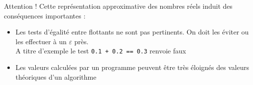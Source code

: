 \documentclass[10pt]{beamer}
\begin{document}
\begin{frame}{\Ctitle}{\stitle}
    \begin{alertblock}{\textcolor{yellow}{\important} Attention !}
        Cette représentation approximative des nombres réels induit des conséquences importantes :
        \begin{itemize}
            \item<2-> Les tests d'égalité entre flottants ne sont pas pertinents. On doit les éviter ou les effectuer à un $\varepsilon$ près. \\
             A titre d'exemple le test {\tt 0.1 + 0.2 == 0.3} renvoie faux
            \item<3-> Les valeurs calculées par un programme peuvent être très éloignés des valeurs théoriques d'un algorithme
        \end{itemize}
    \end{alertblock}
\end{frame}
\end{document}
